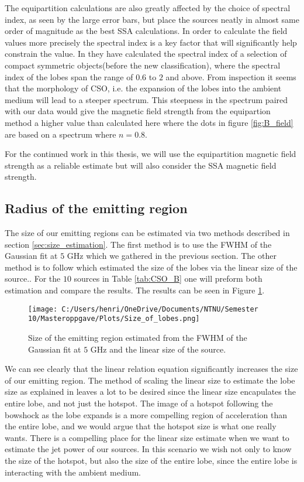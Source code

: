 The equipartition calculations are also greatly affected by the choice of spectral index, as seen by the large error bars, but place the sources neatly in almost same order of magnitude as the best SSA calculations. In order to calculate the field values more precisely the spectral index is a key factor that will significantly help constrain the value. In \cite{Tremblay_2016} they have calculated the spectral index of a selection of compact symmetric objects(before the new classification), where the spectral index of the lobes span the range of $0.6$ to $2$ and above. From inspection it seems that the morphology of CSO, i.e. the expansion of the lobes into the ambient medium will lead to a steeper spectrum. This steepness in the spectrum paired with our data would give the magnetic field strength from the equipartion method a higher value than calculated here where the dots in figure \ref{fig:B_field} are based on a spectrum where $n= 0.8$.




For the continued work in this thesis, we will use the equipartition magnetic field strength as a reliable estimate but will also consider the SSA magnetic field strength.

\subsection{Radius of the emitting region}
The size of our emitting regions can be estimated via two methods described in section \ref{sec:size_estimation}. The first method is to use the FWHM of the Gaussian fit at $5$ GHz which we gathered in the previous section. The other method is to follow \cite{W_jtowicz_2020} which estimated the size of the lobes via the linear size of the source.. For the $10$ sources in Table \ref{tab:CSO_B} one will preform both estimation and compare the results. The results can be seen in Figure \ref{fig:lobe_size}.


\begin{figure}
    \centering
    \texttt{[image: C:/Users/henri/OneDrive/Documents/NTNU/Semester 10/Masteroppgave/Plots/Size\_of\_lobes.png]}
    \caption{Size of the emitting region estimated from the FWHM of the Gaussian fit at $5$ GHz and the linear size of the source.}
    \label{fig:lobe_size}
\end{figure}

We can see clearly that the linear relation equation significantly increases the size of our emitting region. The method of scaling the linear size to estimate the lobe size as explained in \cite{W_jtowicz_2020} leaves a lot to be desired since the linear size encapulates the entire lobe, and not just the hotspot. The image of a hotspot following the bowshock as the lobe expands is a more compelling region of acceleration than the entire lobe, and we would argue that the hotspot size is what one really wants. There is a compelling place for the linear size estimate when we want to estimate the jet power of our sources. In this scenario we wish not only to know the size of the hotspot, but also the size of the entire lobe, since the entire lobe is interacting with the ambient medium.  

